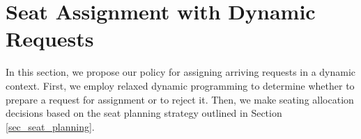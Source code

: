 \section{Seat Assignment with Dynamic Requests}\label{sec_dynamic}
In this section, we propose our policy for assigning arriving requests in a dynamic context. First, we employ relaxed dynamic programming to determine whether to prepare a request for assignment or to reject it. Then, we make seating allocation decisions based on the seat planning strategy outlined in Section \ref{sec_seat_planning}.






